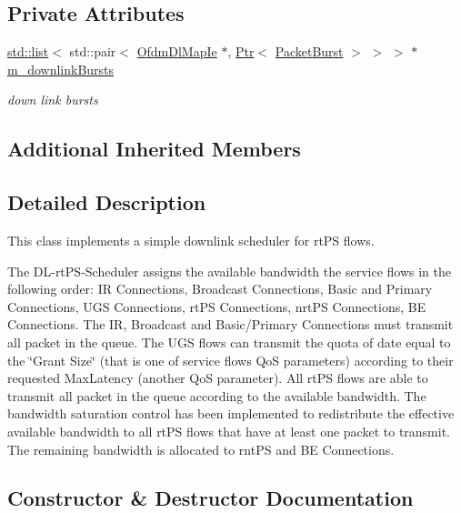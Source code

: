 \subsection*{Private Attributes}
\begin{DoxyCompactItemize}
\item 
\hyperlink{openflow-interface_8h_afd9bcfa176617760671b67580f536fa7}{std\+::list}$<$ std\+::pair$<$ \hyperlink{classns3_1_1OfdmDlMapIe}{Ofdm\+Dl\+Map\+Ie} $\ast$, \hyperlink{classns3_1_1Ptr}{Ptr}$<$ \hyperlink{classns3_1_1PacketBurst}{Packet\+Burst} $>$ $>$ $>$ $\ast$ \hyperlink{classns3_1_1BSSchedulerRtps_afd2e36f0462940e88519935b9df6a6ca}{m\+\_\+downlink\+Bursts}
\begin{DoxyCompactList}\small\item\em down link bursts \end{DoxyCompactList}\end{DoxyCompactItemize}
\subsection*{Additional Inherited Members}


\subsection{Detailed Description}
This class implements a simple downlink scheduler for rt\+PS flows. 

The D\+L-\/rt\+P\+S-\/\+Scheduler assigns the available bandwidth the service flows in the following order\+: IR Connections, Broadcast Connections, Basic and Primary Connections, U\+GS Connections, rt\+PS Connections, nrt\+PS Connections, BE Connections. The IR, Broadcast and Basic/\+Primary Connections must transmit all packet in the queue. The U\+GS flows can transmit the quota of date equal to the \char`\"{}\+Grant Size\char`\"{} (that is one of service flows QoS parameters) according to their requested Max\+Latency (another QoS parameter). All rt\+PS flows are able to transmit all packet in the queue according to the available bandwidth. The bandwidth saturation control has been implemented to redistribute the effective available bandwidth to all rt\+PS flows that have at least one packet to transmit. The remaining bandwidth is allocated to rnt\+PS and BE Connections. 

\subsection{Constructor \& Destructor Documentation}
